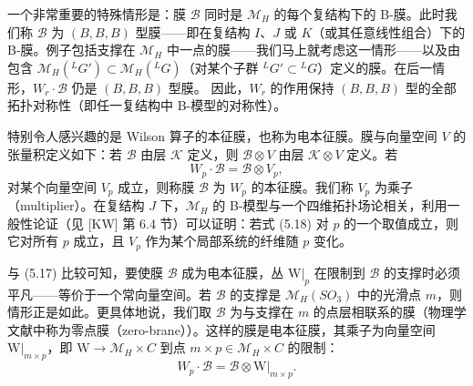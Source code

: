 \documentclass[11pt,a4paper]{article}
\begin{document}
一个非常重要的特殊情形是：膜 $\mathcal{B}$ 同时是 $\mathcal{M}_H$ 的每个复结构下的 B-膜。此时我们称 $\mathcal{B}$ 为 $(B,B,B)$ 型膜——即在复结构 $I$、$J$ 或 $K$（或其任意线性组合）下的 B-膜。例子包括支撑在 $\mathcal{M}_H$ 中一点的膜——我们马上就考虑这一情形——以及由包含 $\mathcal{M}_H({}^{L}G')\subset\mathcal{M}_H({}^{L}G)$（对某个子群 ${}^{L}G'\subset{}^{L}G$）定义的膜。在后一情形，$W_r\cdot\mathcal{B}$ 仍是 $(B,B,B)$ 型膜。
因此，$W_r$ 的作用保持 $(B,B,B)$ 型的全部拓扑对称性（即任一复结构中 B-模型的对称性）。


特别令人感兴趣的是 Wilson 算子的本征膜，也称为电本征膜。膜与向量空间 $V$ 的张量积定义如下：若 $\mathcal{B}$ 由层 $\mathcal{K}$ 定义，则 $\mathcal{B}\otimes V$ 由层 $\mathcal{K}\otimes V$ 定义。若
\begin{equation}\tag{5.18}
W_p\cdot\mathcal{B}=\mathcal{B}\otimes V_p,
\end{equation}
对某个向量空间 $V_p$ 成立，则称膜 $\mathcal{B}$ 为 $W_p$ 的本征膜。我们称 $V_p$ 为乘子（multiplier）。在复结构 $J$ 下，$\mathcal{M}_H$ 的 B-模型与一个四维拓扑场论相关，利用一般性论证（见 [KW] 第 6.4 节）可以证明：若式 (5.18) 对 $p$ 的一个取值成立，则它对所有 $p$ 成立，且 $V_p$ 作为某个局部系统的纤维随 $p$ 变化。

与 (5.17) 比较可知，要使膜 $\mathcal{B}$ 成为电本征膜，丛 $\mathrm{W}|_p$ 在限制到 $\mathcal{B}$ 的支撑时必须平凡——等价于一个常向量空间。若 $\mathcal{B}$ 的支撑是 $\mathcal{M}_H(SO_3)$ 中的光滑点 $m$，则情形正是如此。更具体地说，我们取 $\mathcal{B}$ 为与支撑在 $m$ 的点层相联系的膜（物理学文献中称为零点膜（zero-brane））。这样的膜是电本征膜，其乘子为向量空间 $\mathrm{W}|_{m\times p}$，即
$\mathrm{W}\to\mathcal{M}_H\times C$ 到点 $m\times p\in\mathcal{M}_H\times C$ 的限制：
\begin{equation}\tag{5.19}
W_p\cdot\mathcal{B}=\mathcal{B}\otimes\mathrm{W}|_{m\times p}.
\end{equation}
\end{document}
